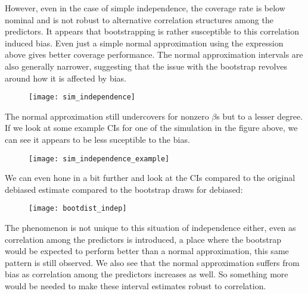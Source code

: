 However, even in the case of simple independence, the coverage rate is below nominal and is not robust to alternative correlation structures among the predictors. It appears that bootstrapping is rather susceptible to this correlation induced bias. Even just a simple normal approximation using the expression above gives better coverage performance. The normal approximation intervals are also generally narrower, suggesting that the issue with the bootstrap revolves around how it is affected by bias.

\begin{figure}[hbtp]
    \begin{center}
    \texttt{[image: sim\_independence]}
    \caption{\label{Fig:sim_independence}}
    \end{center}
\end{figure}

The normal approximation still undercovers for nonzero $\beta$s but to a lesser degree. If we look at some example CIs for one of the simulation in the figure above, we can see it appears to be less suceptible to the bias.

\begin{figure}[hbtp]
    \begin{center}
    \texttt{[image: sim\_independence\_example]}
    \caption{\label{Fig:sim_independence_exaple}}
    \end{center}
\end{figure}

We can even hone in a bit further and look at the CIs compared to the original debiased estimate compared to the bootstrap draws for debiased:

\begin{figure}[hbtp]
    \begin{center}
    \texttt{[image: bootdist\_indep]}
    \caption{\label{Fig:bootdist_indep}}
    \end{center}
\end{figure}

The phenomenon is not unique to this situation of independence either, even as correlation among the predictors is introduced, a place where the bootstrap would be expected to perform better than a normal approximation, this same pattern is still observed. We also see that the normal approximation suffers from bias as correlation among the predictors increases as well. So something more would be needed to make these interval estimates robust to correlation. 

